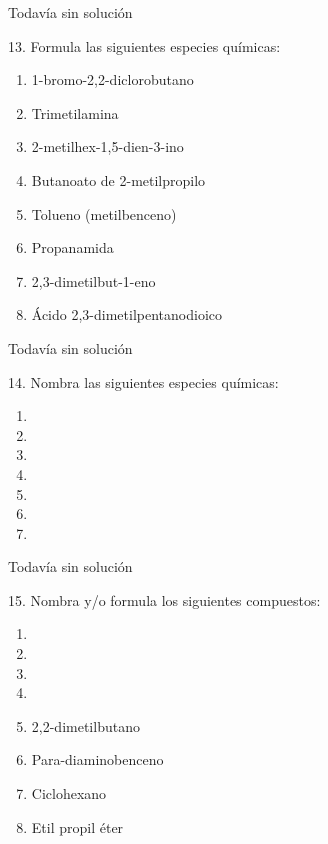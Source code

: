 \documentclass{article}
\begin{document}
\begin{solution}[print=false]
  Todavía sin solución
\end{solution}

\begin{exercise}
  13. Formula las siguientes especies químicas:
  \begin{enumerate}
    \item 1-bromo-2,2-diclorobutano
    \item Trimetilamina
    \item 2-metilhex-1,5-dien-3-ino
    \item Butanoato de 2-metilpropilo
    \item Tolueno (metilbenceno)
    \item Propanamida
    \item 2,3-dimetilbut-1-eno
    \item Ácido 2,3-dimetilpentanodioico
  \end{enumerate}
\end{exercise}

\begin{solution}[print=false]
  Todavía sin solución
\end{solution}

\begin{exercise}
  14. Nombra las siguientes especies químicas:
  \begin{enumerate}
    \item {}
    \item {}
    \item {}
    \item {}
    \item {}
    \item {}
    \item {}
  \end{enumerate}
\end{exercise}

\begin{solution}[print=false]
  Todavía sin solución
\end{solution}

\begin{exercise}
  15. Nombra y/o formula los siguientes compuestos:
  \begin{enumerate}
    \item {}
    \item {}
    \item {}
    \item {}
    \item 2,2-dimetilbutano
    \item Para-diaminobenceno
    \item Ciclohexano
    \item Etil propil éter
  \end{enumerate}
\end{exercise}
\end{document}
